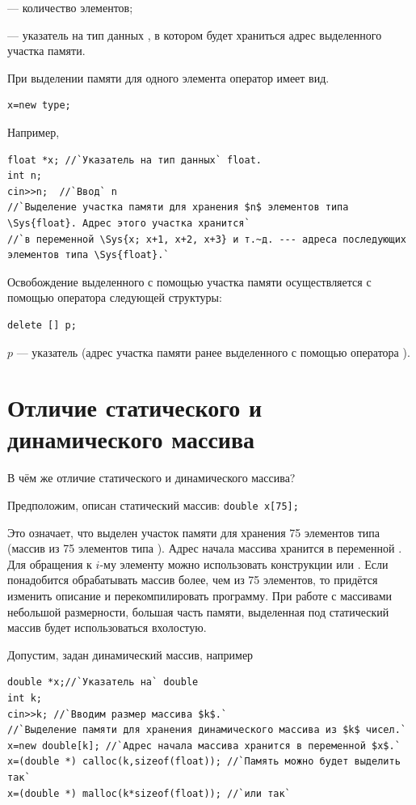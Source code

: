  --- количество элементов;

 --- указатель на тип данных , в котором будет храниться адрес выделенного
участка памяти.

При выделении памяти для одного элемента оператор  имеет вид.
\begin{lstlisting}
x=new type;
\end{lstlisting}
Например,
\begin{lstlisting}
float *x; //`Указатель на тип данных` float.
int n;
cin>>n;  //`Ввод` n 
//`Выделение участка памяти для хранения $n$ элементов типа \Sys{float}. Адрес этого участка хранится`
//`в переменной \Sys{x; x+1, x+2, x+3} и т.~д. --- адреса последующих элементов типа \Sys{float}.`
\end{lstlisting}
Освобождение выделенного с помощью  участка памяти осуществляется  с помощью оператора
 следующей структуры:
\begin{lstlisting}
delete [] p;
\end{lstlisting}
$p$ --- указатель (адрес участка памяти ранее выделенного с помощью оператора ).

\section[Отличие статического и динамического массива]{Отличие статического и динамического массива}
В чём же отличие статического и динамического массива?

Предположим, описан статический массив:
\lstinline!double x[75];!

Это означает, что выделен участок памяти для хранения 75 элементов типа  (массив из 75 элементов типа
). Адрес начала массива хранится в переменной . Для обращения к
$i$-му элементу можно использовать конструкции  или
. Если понадобится обрабатывать массив более, чем из 75 элементов, то придётся изменить
описание и перекомпилировать программу. При работе с массивами небольшой размерности, большая часть памяти, выделенная
под статический массив будет использоваться вхолостую.

Допустим, задан динамический массив, например
\begin{lstlisting}
double *x;//`Указатель на` double
int k;
cin>>k; //`Вводим размер массива $k$.`
//`Выделение памяти для хранения динамического массива из $k$ чисел.` 
x=new double[k]; //`Адрес начала массива хранится в переменной $x$.`
x=(double *) calloc(k,sizeof(float)); //`Память можно будет выделить так`
x=(double *) malloc(k*sizeof(float)); //`или так`
\end{lstlisting}

